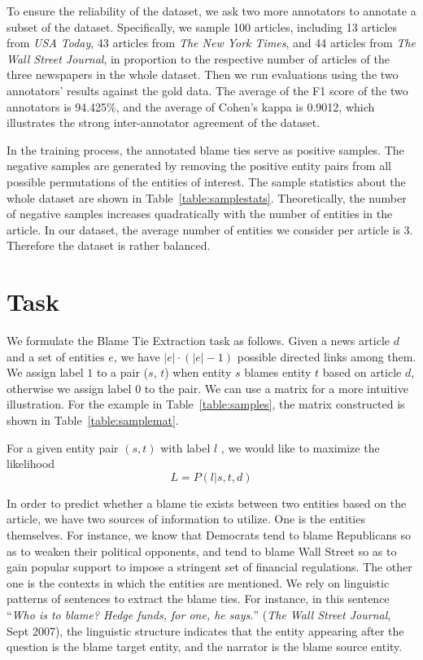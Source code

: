 \documentclass[letterpaper]{article} %
\begin{document}
To ensure the reliability of the dataset, we ask two more annotators to annotate a subset of the dataset. Specifically, we sample 100 articles, including 13 articles from {\it USA Today}, 43 articles from {\it The New York Times}, and 44 articles from {\it The Wall Street Journal}, in proportion to the respective number of articles of the three newspapers in the whole dataset. Then we run evaluations using the two annotators' results against the gold data. The average of the F1 score of the two annotators is 94.425\%, and the average of Cohen's kappa is 0.9012, which illustrates the strong inter-annotator agreement of the dataset.

In the training process, the annotated blame ties serve as positive samples. The negative samples are generated by removing the positive entity pairs from all possible permutations of the entities of interest. The sample statistics about the whole dataset are shown in Table~\ref{table:samplestats}. Theoretically, the number of negative samples increases quadratically with the number of entities in the article. In our dataset, the average number of entities we consider per article is 3. Therefore the dataset is rather balanced.

\section{Task}

We formulate the Blame Tie Extraction task as follows. Given a news article $d$ and a set of entities $e$, we have $ |e| \cdot (|e| - 1)$ possible directed links among them. We assign label $1$ to a pair ($s$, $t$) when entity $s$ blames entity $t$ based on article $d$, otherwise we assign label $0$ to the pair. We can use a matrix for a more intuitive illustration. For the example in Table~\ref{table:samples}, the matrix constructed is shown in Table~\ref{table:samplemat}.

For a given entity pair $(s, t)$ with label $l$ , we would like to maximize the likelihood $$L = P(l | s, t, d)$$

In order to predict whether a blame tie exists between two entities based on the article, we have two sources of information to utilize. One is the entities themselves. For instance, we know that Democrats tend to blame Republicans so as to weaken their political opponents, and tend to blame Wall Street so as to gain popular support to impose a stringent set of financial regulations. The other one is the contexts in which the entities are mentioned. We rely on linguistic patterns of sentences to extract the blame ties. For instance, in this sentence ``{\it Who is to blame? Hedge funds, for one, he says.}'' ({\it The Wall Street Journal}, Sept 2007), the linguistic structure indicates that the entity appearing after the question is the blame target entity, and the narrator is the blame source entity.
\end{document}
